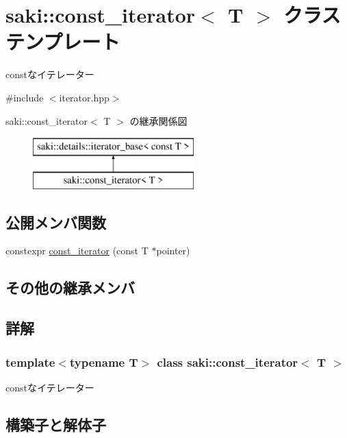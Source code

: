 \hypertarget{classsaki_1_1const__iterator}{}\section{saki\+:\+:const\+\_\+iterator$<$ T $>$ クラステンプレート}
\label{classsaki_1_1const__iterator}


constなイテレーター  




{\ttfamily \#include $<$iterator.\+hpp$>$}

saki\+:\+:const\+\_\+iterator$<$ T $>$ の継承関係図\begin{figure}[H]
\begin{center}
\leavevmode
\includegraphics[height=2.000000cm]{classsaki_1_1const__iterator}
\end{center}
\end{figure}
\subsection*{公開メンバ関数}
\begin{DoxyCompactItemize}
\item 
constexpr \mbox{\hyperlink{classsaki_1_1const__iterator_a67dcc4ecf451800f4fa59a536d672ef5}{const\+\_\+iterator}} (const T $\ast$pointer)
\end{DoxyCompactItemize}
\subsection*{その他の継承メンバ}


\subsection{詳解}
\subsubsection*{template$<$typename T$>$\newline
class saki\+::const\+\_\+iterator$<$ T $>$}

constなイテレーター 

\subsection{構築子と解体子}
\mbox{\label{classsaki_1_1const__iterator_a67dcc4ecf451800f4fa59a536d672ef5}} 
